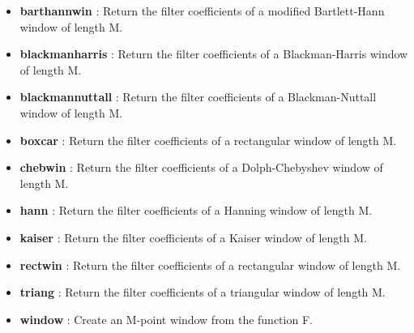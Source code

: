 \documentclass[12pt]{article}
\begin{document}
\begin{itemize}
    {\large For FIR}
    \item {\bfseries barthannwin} :   Return the filter coefficients of a modified Bartlett-Hann window of length M.
    \item {\bfseries blackmanharris} : Return the filter coefficients of a Blackman-Harris window of length M.
    \item {\bfseries blackmannuttall} : Return the filter coefficients of a Blackman-Nuttall window of length M.
    \item {\bfseries boxcar} : Return the filter coefficients of a rectangular window of length M.
    \item {\bfseries chebwin} : Return the filter coefficients of a Dolph-Chebyshev window of length M.
    \item {\bfseries hann} : Return the filter coefficients of a Hanning window of length M.
    \item {\bfseries kaiser} :  Return the filter coefficients of a Kaiser window of length M.
    \item {\bfseries rectwin} : Return the filter coefficients of a rectangular window of length M.
    \item {\bfseries triang} : Return the filter coefficients of a triangular window of length M.
    \item {\bfseries window} : Create an M-point window from the function F.
\end{itemize}
\pagebreak
\end{document}
